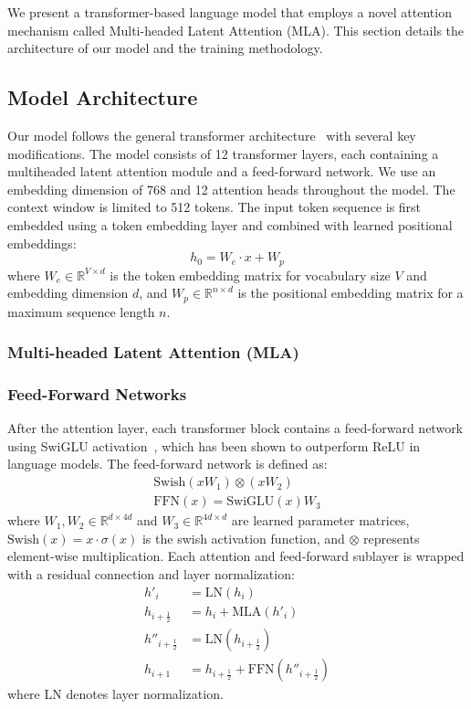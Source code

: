 We present a transformer-based language model that employs a novel attention mechanism called Multi-headed Latent Attention (MLA). This section details the architecture of our model and the training methodology.
\subsection{Model Architecture}
Our model follows the general transformer architecture~\cite{vaswani2023attentionneed} with several key modifications. The model consists of 12 transformer layers, each containing a multiheaded latent attention module and a feed-forward network. We use an embedding dimension of 768 and 12 attention heads throughout the model. The context window is limited to 512 tokens.
The input token sequence is first embedded using a token embedding layer and combined with learned positional embeddings:
\begin{equation}
h_0 = W_e \cdot x + W_p
\end{equation}
\noindent where $W_e \in \mathbb{R}^{V \times d}$ is the token embedding matrix for vocabulary size $V$ and embedding dimension $d$, and $W_p \in \mathbb{R}^{n \times d}$ is the positional embedding matrix for a maximum sequence length $n$.
\subsubsection{Multi-headed Latent Attention (MLA)}

\subsubsection{Feed-Forward Networks}
After the attention layer, each transformer block contains a feed-forward network using SwiGLU activation~\cite{shazeer2020glu}, which has been shown to outperform ReLU in language models. The feed-forward network is defined as:
\begin{align}
\text{Swish}(xW_1) \otimes (xW_2) \\
\text{FFN}(x) = \text{SwiGLU}(x)W_3
\end{align}
\noindent where $W_1, W_2 \in \mathbb{R}^{d \times 4d}$ and $W_3 \in \mathbb{R}^{4d \times d}$ are learned parameter matrices, $\text{Swish}(x) = x \cdot \sigma(x)$ is the swish activation function, and $\otimes$ represents element-wise multiplication.
Each attention and feed-forward sublayer is wrapped with a residual connection and layer normalization:
\begin{align}
  h'_i &= \mathrm{LN}(h_i) \\
  h_{i+\frac12} &= h_i + \mathrm{MLA}(h'_i) \\
  h''_{i+\frac12} &= \mathrm{LN}(h_{i+\frac12}) \\
  h_{i+1} &= h_{i+\frac12} + \mathrm{FFN}(h''_{i+\frac12})
\end{align}
\noindent where $\text{LN}$ denotes layer normalization.
